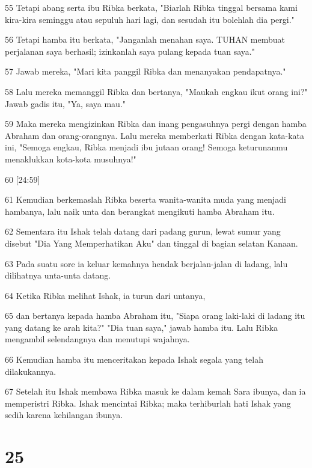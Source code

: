 \par 55 Tetapi abang serta ibu Ribka berkata, "Biarlah Ribka tinggal bersama kami kira-kira seminggu atau sepuluh hari lagi, dan sesudah itu bolehlah dia pergi."
\par 56 Tetapi hamba itu berkata, "Janganlah menahan saya. TUHAN membuat perjalanan saya berhasil; izinkanlah saya pulang kepada tuan saya."
\par 57 Jawab mereka, "Mari kita panggil Ribka dan menanyakan pendapatnya."
\par 58 Lalu mereka memanggil Ribka dan bertanya, "Maukah engkau ikut orang ini?" Jawab gadis itu, "Ya, saya mau."
\par 59 Maka mereka mengizinkan Ribka dan inang pengasuhnya pergi dengan hamba Abraham dan orang-orangnya. Lalu mereka memberkati Ribka dengan kata-kata ini, "Semoga engkau, Ribka menjadi ibu jutaan orang! Semoga keturunanmu menaklukkan kota-kota musuhnya!"
\par 60 [24:59]
\par 61 Kemudian berkemaslah Ribka beserta wanita-wanita muda yang menjadi hambanya, lalu naik unta dan berangkat mengikuti hamba Abraham itu.
\par 62 Sementara itu Ishak telah datang dari padang gurun, lewat sumur yang disebut "Dia Yang Memperhatikan Aku" dan tinggal di bagian selatan Kanaan.
\par 63 Pada suatu sore ia keluar kemahnya hendak berjalan-jalan di ladang, lalu dilihatnya unta-unta datang.
\par 64 Ketika Ribka melihat Ishak, ia turun dari untanya,
\par 65 dan bertanya kepada hamba Abraham itu, "Siapa orang laki-laki di ladang itu yang datang ke arah kita?" "Dia tuan saya," jawab hamba itu. Lalu Ribka mengambil selendangnya dan menutupi wajahnya.
\par 66 Kemudian hamba itu menceritakan kepada Ishak segala yang telah dilakukannya.
\par 67 Setelah itu Ishak membawa Ribka masuk ke dalam kemah Sara ibunya, dan ia memperistri Ribka. Ishak mencintai Ribka; maka terhiburlah hati Ishak yang sedih karena kehilangan ibunya.

\chapter{25}

